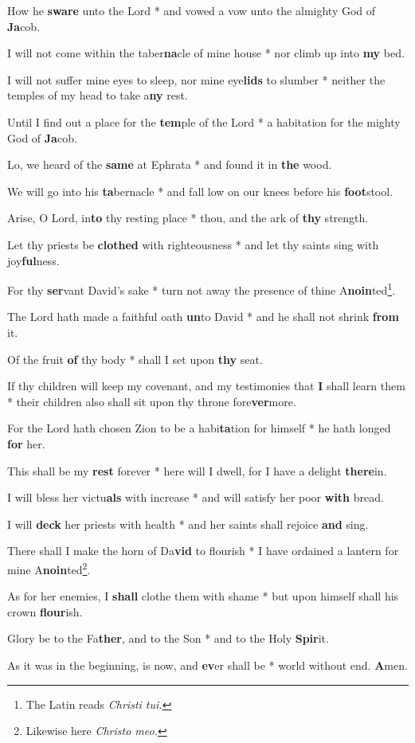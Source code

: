 \begin{multicols}{2}
	How he \textbf{sware} unto the Lord * and vowed a vow unto the almighty God of \textbf{Ja}cob.
	
	I will not come within the taber\textbf{na}cle of mine house * nor climb up into \textbf{my} bed.
	
	I will not suffer mine eyes to sleep, nor mine eye\textbf{lids} to slumber * neither the temples of my head to take a\textbf{ny} rest.
	
	Until I find out a place for the \textbf{tem}ple of the Lord * a habitation for the mighty God of \textbf{Ja}cob.
	
	Lo, we heard of the \textbf{same} at Ephrata * and found it in \textbf{the} wood.
	
	We will go into his \textbf{ta}bernacle * and fall low on our knees before his \textbf{foot}stool.
	
	Arise, O Lord, in\textbf{to} thy resting place * thou, and the ark of \textbf{thy} strength.
	
	Let thy priests be \textbf{clothed} with righteousness * and let thy saints sing with joy\textbf{ful}ness.
	
	For thy \textbf{ser}vant David's sake * turn not away the presence of thine A\textbf{noin}ted\footnote{The Latin reads \textit{Christi tui.}}.
	
	The Lord hath made a faithful oath \textbf{un}to David * and he shall not shrink \textbf{from} it.
	
	Of the fruit \textbf{of} thy body * shall I set upon \textbf{thy} seat.
	
	If thy children will keep my covenant, and my testimonies that \textbf{I} shall learn them * their children also shall sit upon thy throne fore\textbf{ver}more.
	
	For the Lord hath chosen Zion to be a habi\textbf{ta}tion for himself * he hath longed \textbf{for} her.
	
	This shall be my \textbf{rest} forever * here will I dwell, for I have a delight \textbf{there}in.
	
	I will bless her victu\textbf{als} with increase * and will satisfy her poor \textbf{with} bread.
	
	I will \textbf{deck} her priests with health * and her saints shall rejoice \textbf{and} sing.
	
	There shall I make the horn of Da\textbf{vid} to flourish * I have ordained a lantern for mine A\textbf{noin}ted\footnote{Likewise here \textit{Christo meo.}}.
	
	As for her enemies, I \textbf{shall} clothe them with shame * but upon himself shall his crown \textbf{flour}ish.
	
	Glory be to the Fa\textbf{ther}, and to the Son * and to the Holy \textbf{Spir}it.
	
	As it was in the beginning, is now, and \textbf{ev}er shall be * world without end. \textbf{A}men.
\end{multicols}